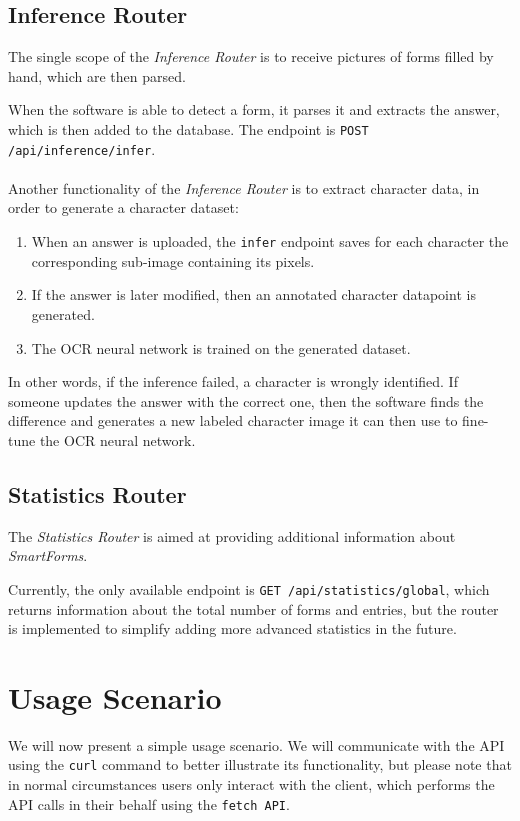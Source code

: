 \documentclass[11pt, a4paper]{report}
\def\code#1{\texttt{#1}}
\begin{document}
\subsection{Inference Router}

The single scope of the \textit{Inference Router} is to receive pictures of forms filled by hand, which are then parsed.

When the software is able to detect a form, it parses it and extracts the answer, which is then added to the database. The endpoint is \code{POST /api/inference/infer}.
\\ \\
Another functionality of the \textit{Inference Router} is to extract character data, in order to generate a character dataset:
\begin{enumerate}
    \item When an answer is uploaded, the \code{infer} endpoint saves for each character the corresponding sub-image containing its pixels.
    \item If the answer is later modified, then an annotated character datapoint is generated.
    \item The OCR neural network is trained on the generated dataset.
\end{enumerate}

In other words, if the inference failed, a character is wrongly identified. If someone updates the answer with the correct one, then the software finds the difference and generates a new labeled character image it can then use to fine-tune the OCR neural network.

\subsection{Statistics Router}

The \textit{Statistics Router} is aimed at providing additional information about \textit{SmartForms}.

Currently, the only available endpoint is \code{GET /api/statistics/global}, which returns information about the total number of forms and entries, but the router is implemented to simplify adding more advanced statistics in the future.

\section{Usage Scenario}

We will now present a simple usage scenario. We will communicate with the API using the \code{curl} command to better illustrate its functionality, but please note that in normal circumstances users only interact with the client, which performs the API calls in their behalf using the \code{fetch API}.
\end{document}
